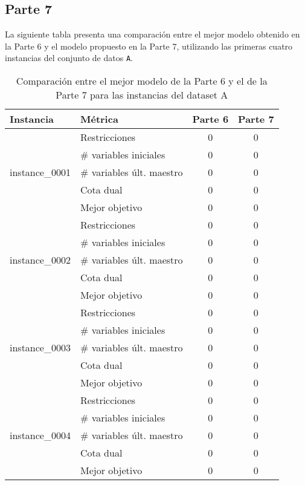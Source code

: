 \documentclass[a4paper,12pt]{article}
\begin{document}
\subsection{Parte 7}
La siguiente tabla presenta una comparación entre el mejor modelo obtenido en la Parte 6 y el modelo propuesto en la Parte 7, utilizando las primeras cuatro instancias del conjunto de datos \texttt{A}.

\begin{table}[h!]
\centering
\renewcommand{\arraystretch}{1.2}
\begin{tabularx}{\textwidth}{lXcc}
\toprule
\textbf{Instancia} & \textbf{Métrica} & \textbf{Parte 6} & \textbf{Parte 7} \\
\midrule
\multirow{5}{*}{instance\_0001} 
  & Restricciones               & 0   & 0   \\
  & \# variables iniciales      & 0   & 0   \\
  & \# variables últ. maestro   & 0   & 0   \\
  & Cota dual                   & 0   & 0   \\
  & Mejor objetivo              & 0   & 0   \\
\midrule
\multirow{5}{*}{instance\_0002} 
  & Restricciones               & 0   & 0   \\
  & \# variables iniciales      & 0   & 0   \\
  & \# variables últ. maestro   & 0   & 0   \\
  & Cota dual                   & 0   & 0   \\
  & Mejor objetivo              & 0   & 0   \\
\midrule
\multirow{5}{*}{instance\_0003} 
  & Restricciones               & 0   & 0   \\
  & \# variables iniciales      & 0   & 0   \\
  & \# variables últ. maestro   & 0   & 0   \\
  & Cota dual                   & 0   & 0   \\
  & Mejor objetivo              & 0   & 0   \\
\midrule
\multirow{5}{*}{instance\_0004} 
  & Restricciones               & 0   & 0   \\
  & \# variables iniciales      & 0   & 0   \\
  & \# variables últ. maestro   & 0   & 0   \\
  & Cota dual                   & 0   & 0   \\
  & Mejor objetivo              & 0   & 0   \\
\bottomrule
\end{tabularx}
\caption{Comparación entre el mejor modelo de la Parte 6 y el de la Parte 7 para las instancias del dataset A}
\end{table}
\end{document}
